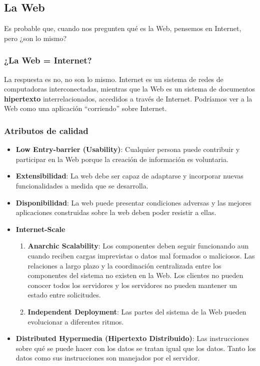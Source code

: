 \documentclass{article}
\begin{document}
		
		
		\subsection{La Web}
		Es probable que, cuando nos pregunten qué es la Web, pensemos en Internet, pero ¿son lo mismo?
		\subsubsection{¿La Web = Internet?}
		La respuesta es no, no son lo mismo. 
		Internet es un sistema de redes de computadoras interconectadas, mientras que la Web es un sistema de documentos \textbf{hipertexto} interrelacionados, accedidos a través de Internet. Podríamos ver a la Web como una aplicación ``corriendo'' sobre Internet.
		
		\subsubsection{Atributos de calidad}
		\begin{itemize}		
			\item \textbf{Low Entry-barrier (Usability)}: Cualquier persona puede contribuir y participar en la Web porque la creación de información es voluntaria.
			
			\item \textbf{Extensibilidad}: La web debe ser capaz de adaptarse y incorporar nuevas funcionalidades a medida que se desarrolla.
			
			\item \textbf{Disponibilidad}: La web puede presentar condiciones adversas y las mejores aplicaciones construidas sobre la web deben poder resistir a ellas.
			
			\item \textbf{Internet-Scale}
			\begin{enumerate}
				\item \textbf{Anarchic Scalability}: Los componentes deben seguir funcionando aun cuando reciben cargas imprevistas o datos mal formados o maliciosos. Las relaciones a largo plazo y la coordinación centralizada entre los componentes del sistema no existen en la Web. Los clientes no pueden conocer todos los servidores y los servidores no pueden mantener un estado entre solicitudes.	
				
				\item \textbf{Independent Deployment}: Las partes del sistema de la Web pueden evolucionar a diferentes ritmos.
			\end{enumerate}
			
			\item \textbf{Distributed Hypermedia (Hipertexto Distribuido)}: Las instrucciones sobre qué se puede hacer con los datos se tratan igual que los datos. Tanto los datos como sus instrucciones son manejados por el servidor.

			
		\end{itemize}
		
\end{document}
